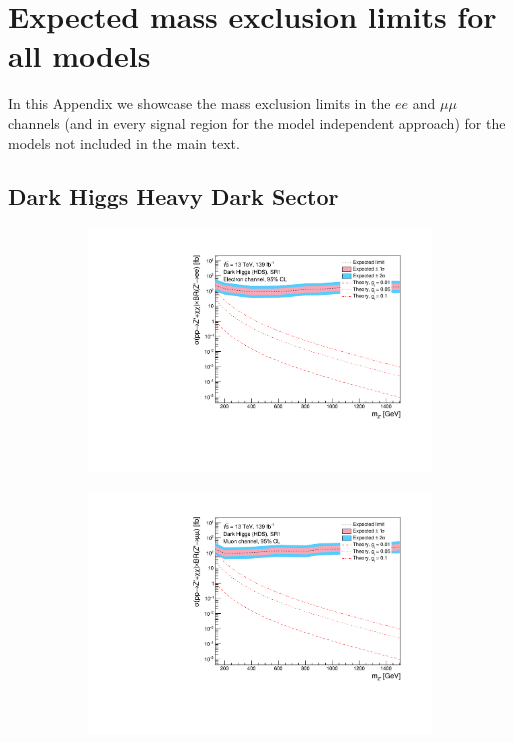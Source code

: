 \documentclass[12pt, a4paper]{book}
\begin{document}
\chapter{Expected mass exclusion limits for all models}\label{apx:MDA}
In this Appendix we showcase the mass exclusion limits in the $ee$ and $\mu\mu$ channels (and in every signal region for the model independent approach) for the models not included in the main text. 
\graphicspath{{../../Plots/}}

\section{Dark Higgs Heavy Dark Sector}
\begin{figure}[!ht]
	\centering
	\begin{subfigure}[b]{0.49\textwidth}
      \centering
      \includegraphics[width=1\textwidth]{Limits/Model_independent/50-100/DH_HDS/mass_exclusion_ee.pdf}
   \end{subfigure}
   \hfill
   \begin{subfigure}[b]{0.49\textwidth}
      \centering
      \includegraphics[width=1\textwidth]{Limits/Model_independent/50-100/DH_HDS/mass_exclusion_uu.pdf}

\end{subfigure}
\end{figure}
\end{document}
